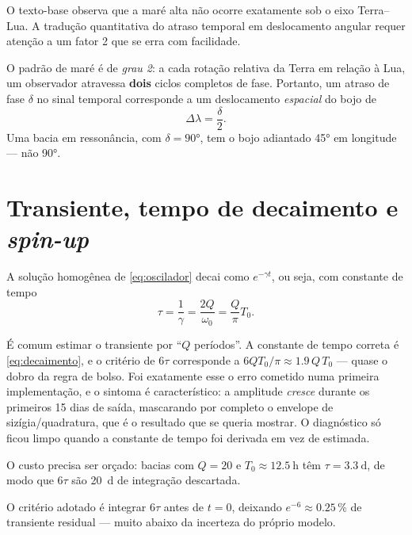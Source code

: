 \documentclass[11pt,a4paper,oneside]{report}
\theoremstyle{definition}
\theoremstyle{plain}
\theoremstyle{remark}
\begin{document}
O texto-base observa que a maré alta não ocorre exatamente sob o eixo
Terra--Lua. A tradução quantitativa do atraso temporal em deslocamento angular
requer atenção a um fator 2 que se erra com facilidade.

O padrão de maré é de \emph{grau 2}: a cada rotação relativa da Terra em
relação à Lua, um observador atravessa \textbf{dois} ciclos completos de fase.
Portanto, um atraso de fase $\delta$ no sinal temporal corresponde a um
deslocamento \emph{espacial} do bojo de
\begin{equation}
\Delta\lambda=\frac{\delta}{2}.
\label{eq:deslocamento}
\end{equation}
Uma bacia em ressonância, com $\delta=\ang{90}$, tem o bojo adiantado
\ang{45} em longitude — não \ang{90}.

\section{Transiente, tempo de decaimento e \emph{spin-up}}
\label{sec:spinup}

A solução homogênea de \eqref{eq:oscilador} decai como
$e^{-\gamma t}$, ou seja, com constante de tempo
\begin{equation}
\tau=\frac{1}{\gamma}=\frac{2Q}{\omega_0}=\frac{Q}{\pi}T_0 .
\label{eq:decaimento}
\end{equation}

\begin{alerta}
É comum estimar o transiente por ``$Q$ períodos''. A constante de tempo correta
é \eqref{eq:decaimento}, e o critério de $6\tau$ corresponde a
$6Q T_0/\pi\approx\num{1.9}\,Q\,T_0$ — quase o dobro da regra de bolso. Foi
exatamente esse o erro cometido numa primeira implementação, e o sintoma é
característico: a amplitude \emph{cresce} durante os primeiros \num{15} dias
de saída, mascarando por completo o envelope de sizígia/quadratura, que é o
resultado que se queria mostrar. O diagnóstico só ficou limpo quando a constante
de tempo foi derivada em vez de estimada.

O custo precisa ser orçado: bacias com $Q=20$ e $T_0\approx\SI{12.5}{\hour}$
têm $\tau=\SI{3.3}{\day}$, de modo que $6\tau$ são \SI{20}{\day} de
integração descartada.
\end{alerta}

O critério adotado é integrar $6\tau$ antes de $t=0$, deixando
$e^{-6}\approx\num{0.25}\,\%$ de transiente residual — muito abaixo da
incerteza do próprio modelo.
\end{document}

